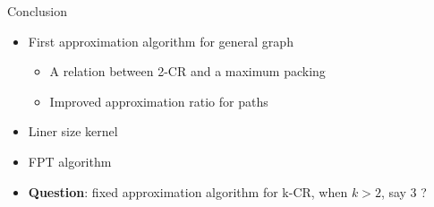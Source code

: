 \begin{frame}{Conclusion}
\begin{itemize}
	

\item
First approximation algorithm for general graph

\begin{itemize}
\pause\item
A relation between 2-CR and a maximum packing 

\pause\item
Improved approximation ratio for paths 
\end{itemize}

\pause\item
Liner size kernel

\pause\item
FPT algorithm

\pause\item
\textbf{Question}: fixed approximation algorithm for k-CR, when $k > 2$, say 3 ?
	
\end{itemize}
\end{frame}